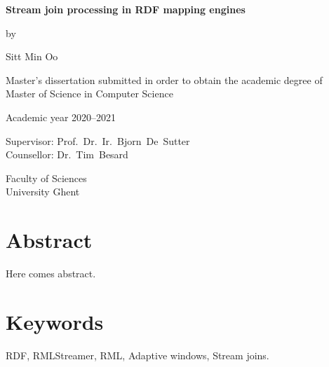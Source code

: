 \newpage

{
\setlength{\baselineskip}{14pt}
\setlength{\parindent}{0pt}
\setlength{\parskip}{8pt}

\begin{center}

\noindent \textbf{\huge
Stream join processing in RDF mapping engines
}

by

Sitt Min Oo

Master's dissertation submitted in order to obtain the academic degree of\\
Master of Science in Computer Science

Academic year 2020--2021

Supervisor: Prof.~Dr.~Ir.~Bjorn~De~Sutter\\
Counsellor: Dr.~Tim~Besard

Faculty of Sciences\\
University Ghent

\end{center}

\section*{Abstract}


Here comes abstract.


\section*{Keywords}

RDF, RMLStreamer, RML, Adaptive windows, Stream joins.
}

\let\cleardoublepage\clearpage
